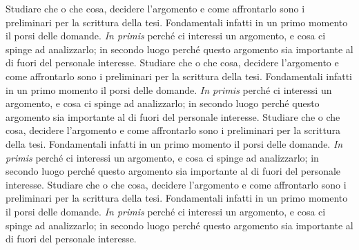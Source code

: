 \documentclass[12pt,a4paper,openright, oneside]{book}
\begin{document}
Studiare che o che cosa, decidere l'argomento e come affrontarlo sono i preliminari per la scrittura della tesi. Fondamentali infatti in un primo momento il porsi delle domande. \textit{In primis} perché ci interessi un argomento, e cosa ci spinge ad analizzarlo; in secondo luogo perché questo argomento sia importante al di fuori del personale interesse. Studiare che o che cosa, decidere l'argomento e come affrontarlo sono i preliminari per la scrittura della tesi. Fondamentali infatti in un primo momento il porsi delle domande. \textit{In primis} perché ci interessi un argomento, e cosa ci spinge ad analizzarlo; in secondo luogo perché questo argomento sia importante al di fuori del personale interesse. Studiare che o che cosa, decidere l'argomento e come affrontarlo sono i preliminari per la scrittura della tesi. Fondamentali infatti in un primo momento il porsi delle domande. \textit{In primis} perché ci interessi un argomento, e cosa ci spinge ad analizzarlo; in secondo luogo perché questo argomento sia importante al di fuori del personale interesse. Studiare che o che cosa, decidere l'argomento e come affrontarlo sono i preliminari per la scrittura della tesi. Fondamentali infatti in un primo momento il porsi delle domande. \textit{In primis} perché ci interessi un argomento, e cosa ci spinge ad analizzarlo; in secondo luogo perché questo argomento sia importante al di fuori del personale interesse. 
\end{document}
